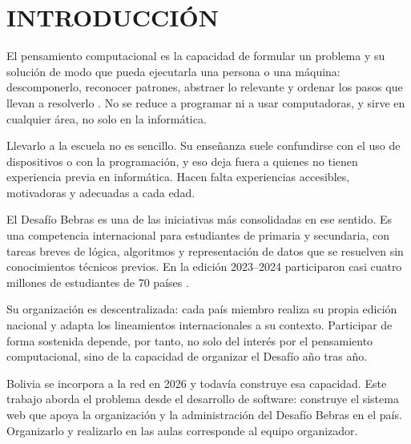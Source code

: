 \chapter{INTRODUCCIÓN}

El pensamiento computacional es la capacidad de formular un problema y su solución de modo que pueda ejecutarla una persona o una máquina: descomponerlo, reconocer patrones, abstraer lo relevante y ordenar los pasos que llevan a resolverlo \parencite{wing2006}. No se reduce a programar ni a usar computadoras, y sirve en cualquier área, no solo en la informática.

Llevarlo a la escuela no es sencillo. Su enseñanza suele confundirse con el uso de dispositivos o con la programación, y eso deja fuera a quienes no tienen experiencia previa en informática. Hacen falta experiencias accesibles, motivadoras y adecuadas a cada edad.

El Desafío Bebras es una de las iniciativas más consolidadas en ese sentido. Es una competencia internacional para estudiantes de primaria y secundaria, con tareas breves de lógica, algoritmos y representación de datos que se resuelven sin conocimientos técnicos previos. En la edición 2023--2024 participaron casi cuatro millones de estudiantes de 70 países \parencite{bebrasstats2024}.

Su organización es descentralizada: cada país miembro realiza su propia edición nacional y adapta los lineamientos internacionales a su contexto. Participar de forma sostenida depende, por tanto, no solo del interés por el pensamiento computacional, sino de la capacidad de organizar el Desafío año tras año.

Bolivia se incorpora a la red en 2026 y todavía construye esa capacidad. Este trabajo aborda el problema desde el desarrollo de software: construye el sistema web que apoya la organización y la administración del Desafío Bebras en el país. Organizarlo y realizarlo en las aulas corresponde al equipo organizador.









\clearpage
